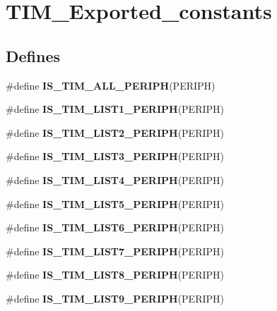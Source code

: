 \hypertarget{group__TIM__Exported__constants}{
\section{TIM\_\-Exported\_\-constants}
\label{group__TIM__Exported__constants}
}
\subsection*{Defines}
\begin{DoxyCompactItemize}
\item 
\#define {\bfseries IS\_\-TIM\_\-ALL\_\-PERIPH}(PERIPH)
\item 
\#define {\bfseries IS\_\-TIM\_\-LIST1\_\-PERIPH}(PERIPH)
\item 
\#define {\bfseries IS\_\-TIM\_\-LIST2\_\-PERIPH}(PERIPH)
\item 
\#define {\bfseries IS\_\-TIM\_\-LIST3\_\-PERIPH}(PERIPH)
\item 
\#define {\bfseries IS\_\-TIM\_\-LIST4\_\-PERIPH}(PERIPH)
\item 
\#define {\bfseries IS\_\-TIM\_\-LIST5\_\-PERIPH}(PERIPH)
\item 
\#define {\bfseries IS\_\-TIM\_\-LIST6\_\-PERIPH}(PERIPH)
\item 
\#define {\bfseries IS\_\-TIM\_\-LIST7\_\-PERIPH}(PERIPH)
\item 
\#define {\bfseries IS\_\-TIM\_\-LIST8\_\-PERIPH}(PERIPH)
\item 
\#define {\bfseries IS\_\-TIM\_\-LIST9\_\-PERIPH}(PERIPH)
\end{DoxyCompactItemize}


